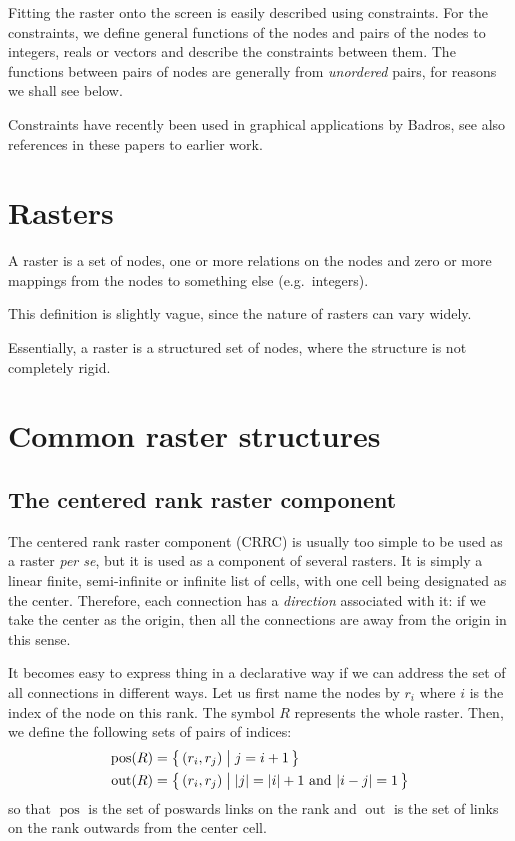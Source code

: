 \documentclass[a4paper]{article}
\DeclareMathOperator{\pos}{pos}
\DeclareMathOperator{\out}{out}
\begin{document}
Fitting the raster onto the screen is easily described using 
constraints.
For the constraints, we define general functions of the nodes and
pairs of the nodes to integers, reals or vectors and
describe the constraints between them.
The functions between pairs of nodes are generally from \emph{unordered}
pairs, for reasons we shall see below.

Constraints have recently been used in graphical applications
by Badros\cite{badrosthesis, badros99constraint, badros98cassowary},
see also references in these papers to earlier work.

\section{Rasters}

A raster is a set of nodes, one or more relations on the nodes
and zero or more mappings from the nodes to something else (e.g.~integers).

This definition is slightly vague, since the nature of rasters
can vary widely. 

Essentially, a raster is a structured set of nodes, where
the structure is not completely rigid.

\section{Common raster structures}

\subsection{The centered rank raster component}

The centered rank raster component (CRRC)
is usually too simple to be used as a raster 
\emph{per se}, but it is used as a component of several rasters.
It is simply a linear finite, semi-infinite or infinite
list of cells, with one cell being designated as the center.
Therefore, each connection has a \emph{direction} associated
with it: if we take the center as the origin, then all 
the connections are away from the origin in this sense.

It becomes easy to express thing in a declarative way if
we can address the set of all connections in different ways.
Let us first name the nodes by $r_i$ where $i$ is the index 
of the node on this rank. The symbol $R$ represents the whole
raster.
Then, we define the following
sets of pairs of indices:
\begin{align}
        \pos(R) &=  \bigl \{\, (r_i, r_j) \bigm| j = i+1 \, \bigr \} \\
        \out(R) &=  \bigl \{\, (r_i, r_j) \bigm| |j| = |i|+1 
                                \text{ and } |i-j| = 1 \, \bigr \}
\end{align}
so that  $\pos$ is the set of poswards links on the rank and $\out$ is the
set of links on the rank outwards from the center cell.
\end{document}
